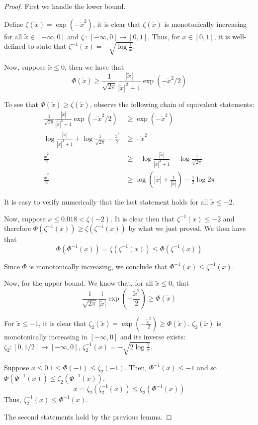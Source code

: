 \documentclass{article}
\begin{document}
\begin{proof}

First we handle the lower bound.

Define $\zeta(\tilde{x}) = \exp(- \tilde{x}^2)$, it is clear that $\zeta(\tilde{x})$ is monotonically increasing for all $\tilde{x} \in [-\infty, 0]$ and $\zeta \,:\, [-\infty, 0] \rightarrow [0, 1]$. Thus, for $x \in [0, 1]$, it is well-defined to state that $\zeta^{-1}(x) = -\sqrt{ \log \frac{1}{x} }$. 

Now, suppose $\tilde{x} \leq 0$, then we have that
\[
\Phi(\tilde{x}) \geq \frac{1}{\sqrt{2\pi}} \frac{|\tilde{x}|}{|\tilde{x}|^2 + 1} \exp( - \tilde{x}^2 / 2) 
\] 

To see that $\Phi(\tilde{x}) \geq \zeta(\tilde{x})$, observe the following chain of equivalent statements:
\begin{align*}
\frac{1}{\sqrt{2\pi}} \frac{|\tilde{x}|}{|\tilde{x}|^2 + 1} \exp( - \tilde{x}^2 / 2) &\geq \exp( - \tilde{x}^2) \\
\log \frac{|\tilde{x}|}{|\tilde{x}|^2 + 1} + \log \frac{1}{\sqrt{2 \pi}} - \frac{\tilde{x}^2}{2} &\geq - \tilde{x}^2 \\
\frac{\tilde{x}^2}{2} &\geq - \log \frac{|\tilde{x}|}{|\tilde{x}|^2 + 1} - \log \frac{1}{\sqrt{2\pi}} \\
\frac{\tilde{x}^2}{2} &\geq \log \left( |\tilde{x}| + \frac{1}{|\tilde{x}|} \right) - \frac{1}{2} \log 2 \pi
\end{align*}

It is easy to verify numerically that the last statement holds for all $\tilde{x} \leq -2$. 

Now, suppose $x \leq 0.018 < \zeta(-2)$. It is clear then that $\zeta^{-1}(x) \leq -2$ and therefore $\Phi(\zeta^{-1}(x)) \geq \zeta(\zeta^{-1}(x))$ by what we just proved. We then have that
\[
\Phi(\Phi^{-1}(x)) = \zeta(\zeta^{-1}(x)) \leq \Phi( \zeta^{-1}(x)) 
\]

Since $\Phi$ is monotonically increasing, we conclude that $\Phi^{-1}(x) \leq \zeta^{-1}(x)$. 

Now, for the upper bound. We know that, for all $\tilde{x} \leq 0$, that
\[
\frac{1}{\sqrt{2\pi}} \frac{1}{|\tilde{x}|} \exp\left( - \frac{\tilde{x}^2}{2} \right) \geq \Phi(\tilde{x})
\]

For $\tilde{x} \leq -1$, it is clear that $\zeta_2(\tilde{x}) = \exp\left( - \frac{\tilde{x}^2}{2} \right) \geq \Phi(\tilde{x})$. $\zeta_2(\tilde{x})$ is monotonically increasing in $[-\infty, 0]$ and its inverse exists: $\zeta_2 : [0, 1/2] \rightarrow [-\infty, 0]$, $\zeta_2^{-1}(x) = -\sqrt{2 \log \frac{1}{x}}$. 

Suppose $x \leq 0.1 \leq \Phi(-1) \leq \zeta_2(-1)$. Then, $\Phi^{-1}(x) \leq -1$ and so $\Phi( \Phi^{-1}(x)) \leq \zeta_2 (\Phi^{-1}(x))$. 
\[
x = \zeta_2(\zeta_2^{-1}(x)) \leq  \zeta_2(\Phi^{-1}(x)) 
\]
Thus, $\zeta_2^{-1}(x) \leq \Phi^{-1}(x)$. 

The second statements hold by the previous lemma. 

\end{proof}
\end{document}
